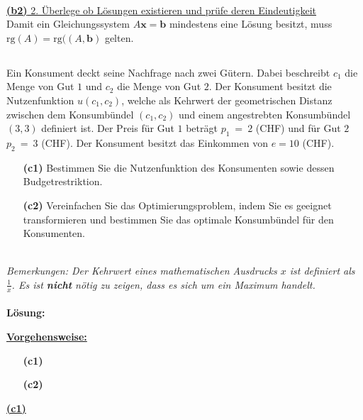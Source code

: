 \ \\
\underline{\textbf{(b2)} 2. Überlege ob Lösungen existieren und prüfe deren Eindeutigkeit}\\
Damit ein Gleichungssystem $ A \mathbf{x} = \mathbf{b} $ mindestens eine Lösung besitzt, muss $ \mathrm{rg}(A) = \mathrm{rg}( (A,\mathbf{b} ) $ gelten.


\newpage
\subsection*{}
Ein Konsument deckt seine Nachfrage nach zwei Gütern. Dabei beschreibt $ c_1 $ die Menge von Gut $ 1 $ und $ c_2 $ die Menge von Gut $ 2 $. Der Konsument besitzt die Nutzenfunktion $ u(c_1,c_2) $, welche als Kehrwert der geometrischen Distanz zwischen dem Konsumbündel $ (c_1,c_2) $ und einem angestrebten Konsumbündel $ (3,3) $ definiert ist. Der Preis für Gut $ 1 $ beträgt $ p_1 \ = \ 2 $ (CHF) und für Gut $ 2 $ $ p_2 \ = \ 3 $ (CHF). Der Konsument besitzt das Einkommen von $ e = 10 $ (CHF).
\begin{enumerate}
	\item[\textbf{(c1)}] 
	Bestimmen Sie die Nutzenfunktion des Konsumenten sowie dessen Budgetrestriktion.
	\item[\textbf{(c2)}]
	Vereinfachen Sie das Optimierungsproblem, indem Sie es geeignet transformieren und bestimmen Sie das optimale Konsumbündel für den Konsumenten.
\end{enumerate}
\ \\
\textit{Bemerkungen: Der Kehrwert eines mathematischen Ausdrucks $ x $ ist definiert als $ \frac{1}{x} $. Es ist \textbf{nicht} nötig zu zeigen, dass es sich um ein Maximum handelt.}
\\ \\
\textbf{Lösung:}
\begin{mdframed}
\underline{\textbf{Vorgehensweise:}}
\begin{enumerate}
\item[\textbf{(c1)}] 
\item[\textbf{(c2)}] 
\end{enumerate}
\end{mdframed}

\underline{\textbf{(c1)} }\\



\newpage

